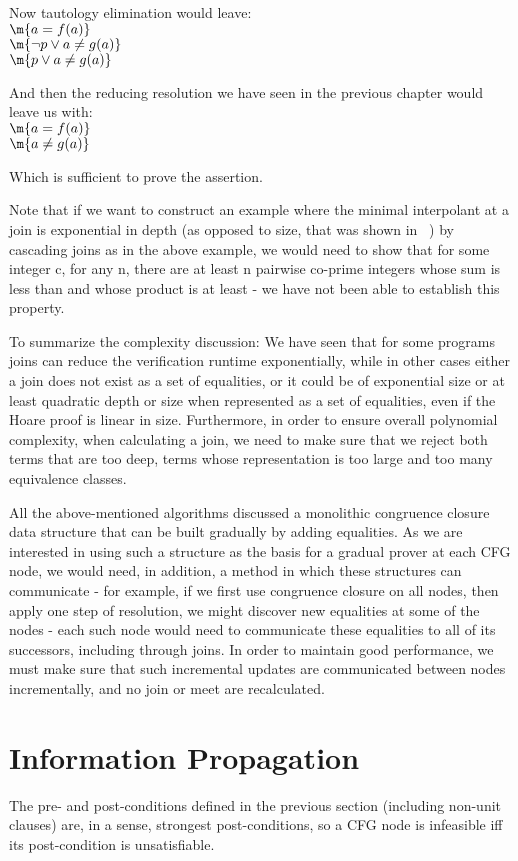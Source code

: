 Now tautology elimination would leave:\\
$\m{a=f(a)}$\\
$\m{\lnot p \lor a \neq g(a)}$\\
$\m{      p \lor a\neq g(a)}$

And then the reducing resolution we have seen in the previous chapter would leave us with:\\
$\m{a=f(a)}$\\
$\m{a \neq g(a)}$

Which is sufficient to prove the assertion.

Note that if we want to construct an example where the minimal interpolant at a join is exponential in depth (as opposed to size, that was shown in ~\cite{GulwaniNecula07}) by cascading joins as in the above example, we would need to show that for some integer c, for any n, there are at least n pairwise co-prime integers whose sum is less than  and whose product is at least  - we have not been able to establish this property.

To summarize the complexity discussion: 
We have seen that for some programs joins can reduce the verification runtime exponentially, while in other cases either a join does not exist as a set of equalities, or it could be of exponential size or at least quadratic depth or size when represented as a set of equalities, even if the Hoare proof is linear in size.
Furthermore, in order to ensure overall polynomial complexity, when calculating a join, we need to make sure that we reject both terms that are too deep, terms whose representation is too large and too many equivalence classes.

All the above-mentioned algorithms discussed a monolithic congruence closure data structure that can be built gradually by adding  equalities. As we are interested in using such a structure as the basis for a gradual prover at each CFG node, we would need, in addition, a method in which these structures can communicate - for example, if we first use congruence closure on all nodes, 
then apply one step of resolution, we might discover new equalities at some of the nodes - each such node would need to communicate these equalities to all of its successors, including through joins. 
In order to maintain good performance, we must make sure that such incremental updates are communicated between nodes incrementally, and no join or meet are recalculated.

\newpage
\section{Information Propagation}
The pre- and post-conditions defined in the previous section (including non-unit clauses) are, in a sense, strongest post-conditions, so a CFG node is infeasible iff its post-condition is unsatisfiable.

